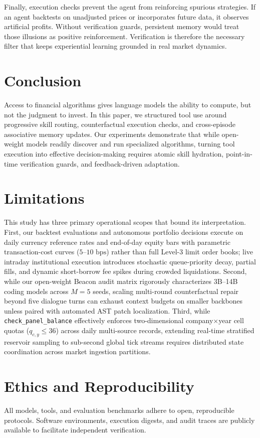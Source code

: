\documentclass[11pt]{article}
\begin{document}
Finally, execution checks prevent the agent from reinforcing spurious strategies. If an
agent backtests on unadjusted prices or incorporates future data, it observes artificial
profits. Without verification guards, persistent memory would treat those illusions as
positive reinforcement. Verification is therefore the necessary filter that keeps
experiential learning grounded in real market dynamics.

\section{Conclusion}
Access to financial algorithms gives language models the ability to compute, but not
the judgment to invest. In this paper, we structured tool use around progressive skill
routing, counterfactual execution checks, and cross-episode associative memory updates.
Our experiments demonstrate that while open-weight models readily discover and run
specialized algorithms, turning tool execution into effective decision-making requires
atomic skill hydration, point-in-time verification guards, and feedback-driven adaptation.

\section*{Limitations}
This study has three primary operational scopes that bound its interpretation. First, our
backtest evaluations and autonomous portfolio decisions execute on daily currency reference
rates and end-of-day equity bars with parametric transaction-cost curves ($5\text{--}10\text{ bps}$)
rather than full Level-3 limit order books; live intraday institutional execution introduces
stochastic queue-priority decay, partial fills, and dynamic short-borrow fee spikes during
crowded liquidations. Second, while our open-weight Beacon audit matrix rigorously characterizes
3B--14B coding models across $M=5$ seeds, scaling multi-round counterfactual repair beyond
five dialogue turns can exhaust context budgets on smaller backbones unless paired with
automated AST patch localization. Third, while \texttt{check\_panel\_balance} effectively enforces
two-dimensional company$\times$year cell quotas ($q_{c,y} \le 36$) across \PanelBalancedRows{}
daily multi-source records, extending real-time stratified reservoir sampling to sub-second
global tick streams requires distributed state coordination across market ingestion partitions.

\section*{Ethics and Reproducibility}
All models, tools, and evaluation benchmarks adhere to open, reproducible protocols.
Software environments, execution digests, and audit traces are publicly available to
facilitate independent verification.


\clearpage
\appendix
\raggedbottom
\makeatletter
\setlength{\@fptop}{0pt}
\setlength{\@fpsep}{14pt}
\setlength{\@fpbot}{0pt plus 1fil}
\makeatother

\clearpage

\end{document}
